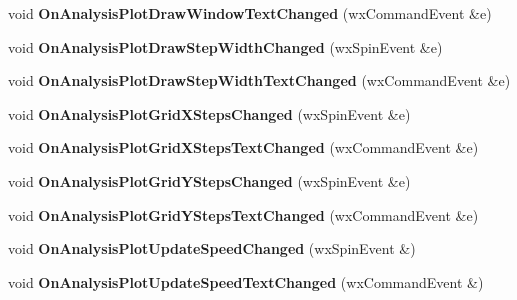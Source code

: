 \begin{DoxyCompactItemize}
\item 
\hypertarget{class_prop_view_frame_a98af39b7e6374d86633ede3da684c172}{void {\bfseries On\+Analysis\+Plot\+Draw\+Window\+Text\+Changed} (wx\+Command\+Event \&e)}\label{class_prop_view_frame_a98af39b7e6374d86633ede3da684c172}

\item 
\hypertarget{class_prop_view_frame_ae03007db3a2df05dca4cfe9a9a8ecc91}{void {\bfseries On\+Analysis\+Plot\+Draw\+Step\+Width\+Changed} (wx\+Spin\+Event \&e)}\label{class_prop_view_frame_ae03007db3a2df05dca4cfe9a9a8ecc91}

\item 
\hypertarget{class_prop_view_frame_ad5912c0dbbae975c6fe15669e1839ca9}{void {\bfseries On\+Analysis\+Plot\+Draw\+Step\+Width\+Text\+Changed} (wx\+Command\+Event \&e)}\label{class_prop_view_frame_ad5912c0dbbae975c6fe15669e1839ca9}

\item 
\hypertarget{class_prop_view_frame_a09d2d2cecfcd86a2b38c733a1761038c}{void {\bfseries On\+Analysis\+Plot\+Grid\+X\+Steps\+Changed} (wx\+Spin\+Event \&e)}\label{class_prop_view_frame_a09d2d2cecfcd86a2b38c733a1761038c}

\item 
\hypertarget{class_prop_view_frame_a523b627e70461bda72c91d84b76610cc}{void {\bfseries On\+Analysis\+Plot\+Grid\+X\+Steps\+Text\+Changed} (wx\+Command\+Event \&e)}\label{class_prop_view_frame_a523b627e70461bda72c91d84b76610cc}

\item 
\hypertarget{class_prop_view_frame_a7613b4d0c375e52963d078f5cd75d3d4}{void {\bfseries On\+Analysis\+Plot\+Grid\+Y\+Steps\+Changed} (wx\+Spin\+Event \&e)}\label{class_prop_view_frame_a7613b4d0c375e52963d078f5cd75d3d4}

\item 
\hypertarget{class_prop_view_frame_a1e6174cdb3017be7a460905935148881}{void {\bfseries On\+Analysis\+Plot\+Grid\+Y\+Steps\+Text\+Changed} (wx\+Command\+Event \&e)}\label{class_prop_view_frame_a1e6174cdb3017be7a460905935148881}

\item 
\hypertarget{class_prop_view_frame_a170695590c1498b854aae14f2608fdc4}{void {\bfseries On\+Analysis\+Plot\+Update\+Speed\+Changed} (wx\+Spin\+Event \&)}\label{class_prop_view_frame_a170695590c1498b854aae14f2608fdc4}

\item 
\hypertarget{class_prop_view_frame_a903740828675f843fa698445cb8187cd}{void {\bfseries On\+Analysis\+Plot\+Update\+Speed\+Text\+Changed} (wx\+Command\+Event \&)}\label{class_prop_view_frame_a903740828675f843fa698445cb8187cd}


\end{DoxyCompactItemize}
